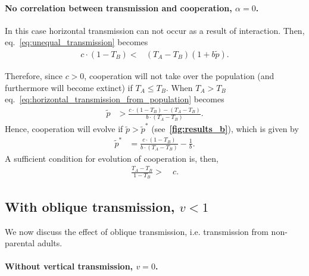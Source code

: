 \documentclass[12pt]{extarticle}
\begin{document}
\paragraph*{No correlation between transmission and cooperation, $\alpha=0$.}

In this case horizontal transmission can not occur as a result of interaction.  
Then, eq.~\ref{eq:unequal_transmission} becomes
\begin{equation} 
\begin{split} \label{eq:horizontal_transmission_from_population}
c\cdot(1-T_B) < & (T_A-T_B)(1+b\tilde{p}).
\end{split}
\end{equation}

Therefore, since $c>0$, cooperation will not take over the population (and furthermore will become extinct) if $T_A\leq T_B$.
When $T_A > T_B$ eq.~\ref{eq:horizontal_transmission_from_population} becomes
\begin{equation} 
\begin{split} \label{eq:horizontal_transmission_from_population_reorder}
\tilde{p} & > \frac{c\cdot(1-T_B) - (T_A-T_B)}{b\cdot(T_A-T_B)}.
\end{split}
\end{equation}
Hence, cooperation will evolve if $\tilde{p} > \tilde{p}^{*}$ (see~\textbf{\autoref{fig:results_b}}), which is given by
\begin{equation} 
\begin{split} \label{eq:horizontal_transmission_from_population_equilibrium}
\tilde{p}^{*} & = \frac{c\cdot(1-T_B)}{b\cdot(T_A-T_B)} - \frac{1}{b}.
\end{split}
\end{equation}
A sufficient condition for evolution of cooperation is, then,
\begin{equation} 
\begin{split} \label{eq:sufficient_horizontal_transmission_from_population}
\frac{T_A-T_B}{1-T_B} > &\ c.  
\end{split}
\end{equation}

\subsection*{With oblique transmission, $v<1$}
    
We now discuss the effect of oblique transmission, i.e. transmission from non-parental adults.

\paragraph*{Without vertical transmission, $v = 0$.}
\end{document}

